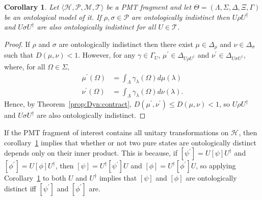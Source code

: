 \documentclass[DIV=calc,fontsize=12pt]{scrartcl} %
\theoremstyle{definition}
\theoremstyle{plain}
\newtheorem{corollary}[definition]{Corollary}
\newcommand{\Proj}[1]{\ensuremath{\left [ #1 \right ]}}
\newcommand{\Hilb}[1][]{\ensuremath{\mathcal{H}_{#1}}}
\begin{document}
\begin{corollary}
\label{cor:Dyn:contract}
Let $\langle \Hilb, \mathcal{P}, \mathcal{M}, \mathcal{T} \rangle$
be a PMT fragment and let $\Theta = (\Lambda, \Sigma, \Delta, \Xi,
\Gamma)$ be an ontological model of it.  If $\rho, \sigma \in
\mathcal{P}$ are ontologically indistinct then $U\rho U^{\dagger}$
and $U \sigma U^{\dagger}$ are also ontologically indistinct for all
$U \in \mathcal{T}$.
\end{corollary}
\begin{proof}
If $\rho$ and $\sigma$ are ontologically indistinct then there exist
$\mu \in \Delta_{\rho}$ and $\nu \in \Delta_{\sigma}$ such that
$D(\mu,\nu) < 1$.  However, for any $\gamma \in \Gamma_U$,
$\mu^{\prime} \in \Delta_{U \rho U^{\dagger}}$ and $\nu^{\prime} \in
\Delta_{U \sigma U^{\dagger}}$, where, for all $\Omega \in \Sigma$,
\begin{align}
\mu^{\prime}(\Omega) & = \int_{\Lambda}
\gamma_{\lambda}(\Omega)d\mu(\lambda) \\
\nu^{\prime}(\Omega) & = \int_{\Lambda} \gamma_{\lambda}(\Omega)
d\nu(\lambda).
\end{align}
Hence, by Theorem~\ref{prop:Dyn:contract},
$D(\mu^{\prime},\nu^{\prime}) \leq D(\mu,\nu) < 1$, so $U \rho
U^{\dagger}$ and $U \sigma U^{\dagger}$ are also ontologically
indistinct.
\end{proof}

If the PMT fragment of interest contains all unitary transformations
on $\Hilb$, then corollary~\ref{cor:Dyn:contract} implies that whether
or not two pure states are ontologically distinct depends only on
their inner product.  This is because, if $\Proj{\psi^{\prime}} =
U\Proj{\psi}U^{\dagger}$ and $\Proj{\phi^{\prime}} = U
\Proj{\phi}U^{\dagger}$, then $\Proj{\psi} =
U^{\dagger}\Proj{\psi^{\prime}}U$ and $\Proj{\phi} = U^{\dagger}
\Proj{\phi^{\prime}} U$, so applying Corollary~\ref{cor:Dyn:contract}
to both $U$ and $U^{\dagger}$ implies that $\Proj{\psi}$ and
$\Proj{\phi}$ are ontologically distinct iff $\Proj{\psi^{\prime}}$
and $\Proj{\phi^{\prime}}$ are.
\end{document}
